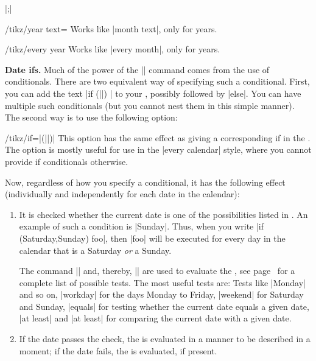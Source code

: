 \begin{command}{\calendar {}|;|}
    \begin{key}{/tikz/year text=}
        Works like |month text|, only for years.
    \end{key}


    \begin{key}{/tikz/every year}
        Works like |every month|, only for years.
    \end{key}


    \medskip
    \textbf{Date ifs.}
    Much of the power of the |\calendar| command comes from the use of
    conditionals. There are two equivalent way of specifying such a
    conditional. First, you can add the text
    |if (||) | to your , possibly followed by |else|. You
    can have multiple such conditionals (but you cannot nest them in this
    simple manner). The second way is to use the following option:
    \begin{key}{/tikz/if=|(||)|}
        This option has the same effect as giving a corresponding if in the
        . The option is mostly useful for use in
        the |every calendar| style, where you cannot provide if conditionals
        otherwise.
    \end{key}
    Now, regardless of how you specify a conditional, it has the following
    effect (individually and independently for each date in the calendar):
    \begin{enumerate}
        \item It is checked whether the current date is one of the
            possibilities listed in . An example of such a
            condition is |Sunday|. Thus, when you write
            |if (Saturday,Sunday) {foo}|, then |foo| will be executed for every
            day in the calendar that is a Saturday \emph{or} a Sunday.

            The command |\ifdate| and, thereby, |\pgfcalendarifdate| are used
            to evaluate the , see
            page~\pageref{pgfcalendarifdate} for a complete list of possible
            tests. The most useful tests are: Tests like |Monday| and so on,
            |workday| for the days Monday to Friday, |weekend| for Saturday and
            Sunday, |equals| for testing whether the current date equals a
            given date, |at least| and |at least| for comparing the current
            date with a given date.
        \item If the date passes the check, the  is
            evaluated in a manner to be described in a moment; if the date
            fails, the  is evaluated, if present.


\end{enumerate}
\end{command}
